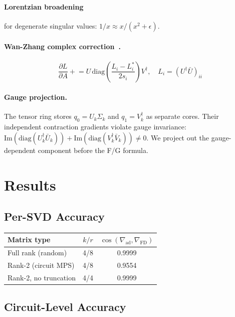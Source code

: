 \documentclass[11pt]{article}
\begin{document}
\paragraph{Lorentzian broadening} for degenerate singular values: $1/x \approx x/(x^2 + \epsilon)$.

\paragraph{Wan-Zhang complex correction~\cite{wan2019automatic}.}
\begin{equation}
\frac{\partial L}{\partial A} \mathrel{+}= U \, \mathrm{diag}\!\left(\frac{L_i - L_i^*}{2 s_i}\right) V^\dagger, \quad L_i = (U^\dagger \bar{U})_{ii}
\end{equation}

\paragraph{Gauge projection.} The tensor ring stores $q_0 = U_k \Sigma_k$ and $q_1 = V_k^\dagger$ as separate cores. Their independent contraction gradients violate gauge invariance: $\mathrm{Im}(\mathrm{diag}(U_k^\dagger \bar{U}_k)) + \mathrm{Im}(\mathrm{diag}(V_k^\dagger \bar{V}_k)) \neq 0$. We project out the gauge-dependent component before the F/G formula.

\section{Results}

\subsection{Per-SVD Accuracy}

\begin{center}
\begin{tabular}{lcc}
\toprule
Matrix type & $k/r$ & $\cos(\nabla_{\mathrm{ad}}, \nabla_{\mathrm{FD}})$ \\
\midrule
Full rank (random) & 4/8 & 0.9999 \\
Rank-2 (circuit MPS) & 4/8 & 0.9554 \\
Rank-2, no truncation & 4/4 & 0.9999 \\
\bottomrule
\end{tabular}
\end{center}

\subsection{Circuit-Level Accuracy}
\end{document}
